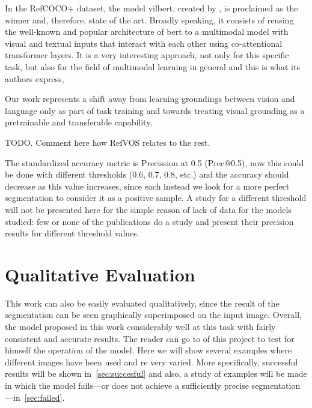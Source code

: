 In the RefCOCO+ dataset, the model \gls{vilbert}, created by
, is proclaimed as the winner and, therefore, state of the
art. Broadly speaking, it consists of reusing the well-known and popular
architecture of \gls{bert} to a multimodal model with visual and textual inputs
that interact with each other using co-attentional transformer layers. It is a
very interesting approach, not only for this specific task, but also for the
field of multimodal learning in general and this is what its authors express,

\begin{quoteBox}
  Our work represents a shift away from learning groundings between vision and
  language only as part of task training and towards treating visual grounding
  as a pretrainable and transferable capability.
  \tcblower{}
\end{quoteBox}

TODO. Comment here how RefVOS relates to the rest.

The standardized accuracy metric is Precission at 0.5 (Prec@0.5), now this
could be done with different thresholds (0.6, 0.7, 0.8, etc.) and the accuracy
should decrease as this value increases, since each instead we look for a more
perfect segmentation to consider it as a positive sample. A study for a
different threshold will not be presented here for the simple reason of lack of
data for the models studied: few or none of the publications do a study and
present their precision results for different threshold values.


\section{Qualitative Evaluation}\label{sec:qualitative-eval-res}

This work can also be easily evaluated qualitatively, since the result of the
segmentation can be seen graphically superimposed on the input image. Overall,
the model proposed in this work considerably well at this task with fairly
consistent and accurate results. The reader can go to
 of this project to test for
himself the operation of the model. Here we will show several examples where
different images have been used and \gls{re} very varied. More specifically,
successful results will be shown in\ \vref{sec:succesful} and also, a study of
examples will be made in which the model fails---or does not achieve a
sufficiently precise segmentation---in\ \vref{sec:failed}.


